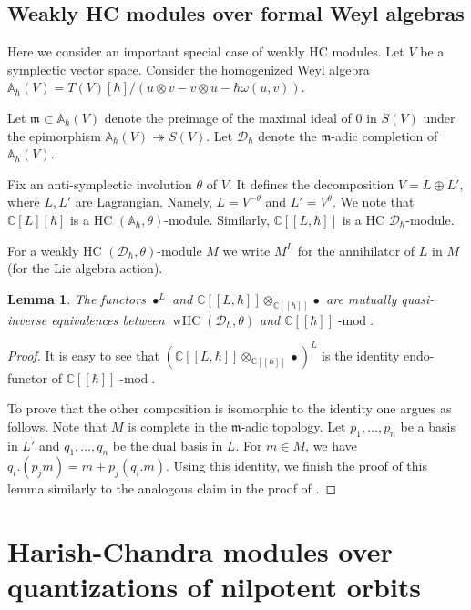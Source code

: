 \documentclass[12pt]{amsart}
\newcommand{\C}{\mathbb{C}}
\newcommand{\wHC}{\operatorname{wHC}}
\newcommand{\Weyl}{\mathbb{A}}
\newcommand{\Dcal}{\mathcal{D}}
\newtheorem{Lem}[Thm]{Lemma}
\theoremstyle{definition}
\numberwithin{equation}{section}
\begin{document}
\subsection{Weakly HC modules over formal Weyl algebras}
Here we consider an important special case of weakly HC modules.
Let $V$ be a symplectic vector space. Consider the homogenized Weyl algebra
$\Weyl_\hbar(V)=T(V)[\hbar]/(u\otimes v-v\otimes u-\hbar\omega(u,v))$.

Let $\mathfrak{m}\subset \Weyl_\hbar(V)$ denote the preimage of the maximal ideal of $0$ in $S(V)$
under the epimorphism $\Weyl_\hbar(V)\twoheadrightarrow S(V)$. Let $\Dcal_\hbar$ denote the
$\mathfrak{m}$-adic completion of $\Weyl_\hbar(V)$.

Fix an anti-symplectic involution $\theta$ of $V$. It defines the decomposition
$V=L\oplus L'$, where $L,L'$ are Lagrangian. Namely, $L=V^{-\theta}$ and $L'=V^{\theta}$.
We note that $\C[L][\hbar]$ is a HC $(\Weyl_\hbar, \theta)$-module. Similarly,
$\C[[L,\hbar]]$ is a HC $\Dcal_\hbar$-module.

For a weakly HC $(\Dcal_\hbar,\theta)$-module $M$ we write $M^L$
for the annihilator of $L$ in $M$ (for the Lie algebra action).

\begin{Lem}\label{Lem:wHC_formal_Weyl}
The functors $\bullet^L$ and $\C[[L,\hbar]]\otimes_{\C[[\hbar]]}\bullet$
are mutually quasi-inverse equivalences between $\wHC(\Dcal_\hbar,\theta)$
and $\C[[\hbar]]\operatorname{-mod}$.
\end{Lem}
\begin{proof}
It is easy to see that $(\C[[L,\hbar]]\otimes_{\C[[\hbar]]}\bullet)^L$
is the identity endo-functor of $\C[[\hbar]]\operatorname{-mod}$.

To prove that the other composition is isomorphic to the identity one argues as follows.
Note that $M$ is complete in the $\mathfrak{m}$-adic topology.
Let $p_1,\ldots,p_n$ be a basis in $L'$ and $q_1,\ldots,q_n$ be the
dual basis in $L$. For $m\in M$, we have $q_i.(p_jm)=m+p_j(q_i.m)$.
Using this identity, we finish the proof of this lemma similarly to the analogous claim in
the proof of \cite[Proposition 3.3.1]{HC}.
\end{proof}




\section{Harish-Chandra modules over quantizations of nilpotent orbits}
\end{document}
